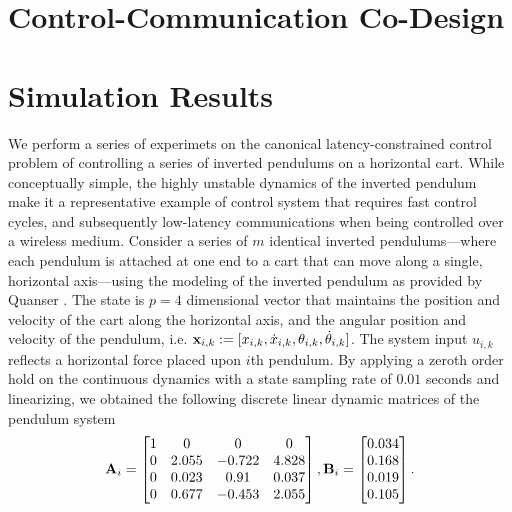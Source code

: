 \documentclass{article}
\begin{document}
\section{Control-Communication Co-Design}\label{sec_codesign}










 
 \section{Simulation Results}\label{sec_numerical_results}
 
We perform a series of experimets on the canonical latency-constrained control problem of controlling a series of inverted pendulums on a horizontal cart. While conceptually simple, the highly unstable dynamics of the inverted pendulum make it a representative example of control system that requires fast control cycles, and subsequently low-latency communications when being controlled over a wireless medium. Consider a series of $m$ identical inverted pendulums---where each pendulum is attached at one end to a cart that can move along a single, horizontal axis---using the modeling of the inverted pendulum as provided by Quanser \cite{quanser}. The state is $p=4$ dimensional vector that maintains the position and velocity of the cart along the horizontal axis, and the angular position and velocity of the pendulum, i.e. ${\mathbf x}_{i,k} := [x_{i,k}, \dot{x}_{i,k}, \theta_{i,k}, \dot{\theta}_{i,k}]$. The system input $u_{i,k}$ reflects a horizontal force placed upon $i$th pendulum. By applying a zeroth order hold on the continuous dynamics with a state sampling rate of $0.01$ seconds and linearizing, we obtained the following discrete linear dynamic matrices of the pendulum system
%
\begin{align}\label{eq_control_orig}
{\ensuremath{\mathbf A}}_i =
\begin{bmatrix}
1 & 0 & 0 & 0 \\
0 & 2.055 & -0.722 & 4.828 \\
0 & 0.023 & 0.91 & 0.037 \\
0 & 0.677 & -0.453 & 2.055
\end{bmatrix},
{\mathbf B}_i =
\begin{bmatrix}
0.034 \\ 0.168 \\ 0.019 \\ 0.105
\end{bmatrix}.
\end{align}
%
\end{document}
